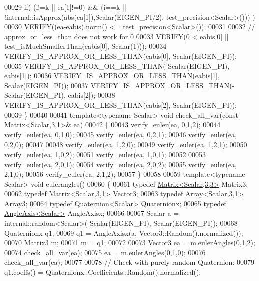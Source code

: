\begin{DoxyCode}
00029   \textcolor{keywordflow}{if}( (i!=k || ea[1]!=0) && (i==k || !internal::isApprox(abs(ea[1]),Scalar(EIGEN\_PI/2),
      test\_precision<Scalar>())) ) 
00030     VERIFY((ea-eabis).norm() <= test\_precision<Scalar>());
00031   
00032   \textcolor{comment}{// approx\_or\_less\_than does not work for 0}
00033   VERIFY(0 < eabis[0] || test\_isMuchSmallerThan(eabis[0], Scalar(1)));
00034   VERIFY\_IS\_APPROX\_OR\_LESS\_THAN(eabis[0], Scalar(EIGEN\_PI));
00035   VERIFY\_IS\_APPROX\_OR\_LESS\_THAN(-Scalar(EIGEN\_PI), eabis[1]);
00036   VERIFY\_IS\_APPROX\_OR\_LESS\_THAN(eabis[1], Scalar(EIGEN\_PI));
00037   VERIFY\_IS\_APPROX\_OR\_LESS\_THAN(-Scalar(EIGEN\_PI), eabis[2]);
00038   VERIFY\_IS\_APPROX\_OR\_LESS\_THAN(eabis[2], Scalar(EIGEN\_PI));
00039 \}
00040 
00041 \textcolor{keyword}{template}<\textcolor{keyword}{typename} Scalar> \textcolor{keywordtype}{void} check\_all\_var(\textcolor{keyword}{const} \hyperlink{group___core___module}{Matrix<Scalar,3,1>}& ea)
00042 \{
00043   verify\_euler(ea, 0,1,2);
00044   verify\_euler(ea, 0,1,0);
00045   verify\_euler(ea, 0,2,1);
00046   verify\_euler(ea, 0,2,0);
00047 
00048   verify\_euler(ea, 1,2,0);
00049   verify\_euler(ea, 1,2,1);
00050   verify\_euler(ea, 1,0,2);
00051   verify\_euler(ea, 1,0,1);
00052 
00053   verify\_euler(ea, 2,0,1);
00054   verify\_euler(ea, 2,0,2);
00055   verify\_euler(ea, 2,1,0);
00056   verify\_euler(ea, 2,1,2);
00057 \}
00058 
00059 \textcolor{keyword}{template}<\textcolor{keyword}{typename} Scalar> \textcolor{keywordtype}{void} eulerangles()
00060 \{
00061   \textcolor{keyword}{typedef} \hyperlink{group___core___module_class_eigen_1_1_matrix}{Matrix<Scalar,3,3>} Matrix3;
00062   \textcolor{keyword}{typedef} \hyperlink{group___core___module}{Matrix<Scalar,3,1>} Vector3;
00063   \textcolor{keyword}{typedef} \hyperlink{group___core___module_class_eigen_1_1_array}{Array<Scalar,3,1>} Array3;
00064   \textcolor{keyword}{typedef} \hyperlink{group___geometry___module_class_eigen_1_1_quaternion}{Quaternion<Scalar>} Quaternionx;
00065   \textcolor{keyword}{typedef} \hyperlink{group___geometry___module_class_eigen_1_1_angle_axis}{AngleAxis<Scalar>} AngleAxisx;
00066 
00067   Scalar a = internal::random<Scalar>(-Scalar(EIGEN\_PI), Scalar(EIGEN\_PI));
00068   Quaternionx q1;
00069   q1 = AngleAxisx(a, Vector3::Random().normalized());
00070   Matrix3 m;
00071   m = q1;
00072   
00073   Vector3 ea = m.eulerAngles(0,1,2);
00074   check\_all\_var(ea);
00075   ea = m.eulerAngles(0,1,0);
00076   check\_all\_var(ea);
00077   
00078   \textcolor{comment}{// Check with purely random Quaternion:}
00079   q1.coeffs() = Quaternionx::Coefficients::Random().normalized();

\end{DoxyCode}

